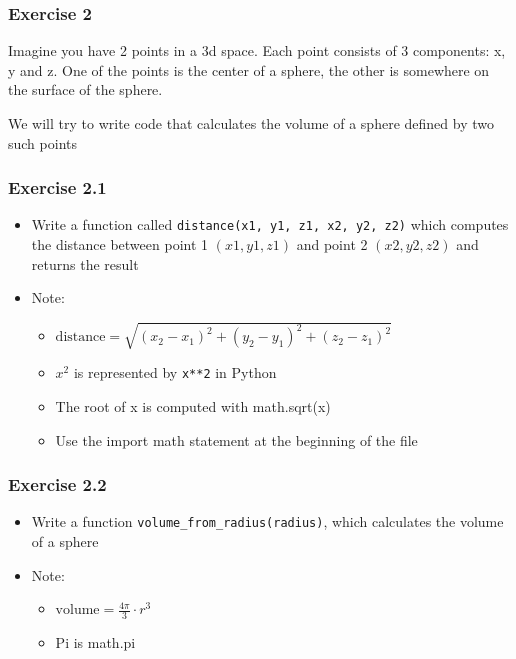 \documentclass[10pt, a4paper]{beamer} %
\begin{document}
{\begin{frame}
\end{frame}

\begin{frame}[c, fragile]\frametitle{Exercise 2}

    Imagine you have 2 points in a 3d space.
    Each point consists of 3 components: x, y and z.
    One of the points is the center of a sphere, the other is somewhere on the surface of the sphere.

    We will try to write code that calculates the volume of a sphere defined by two
    such points
\end{frame}
\begin{frame}[c, fragile]\frametitle{Exercise 2.1}
    \begin{itemize}
        \item Write a function called \texttt{distance(x1, y1, z1, x2, y2, z2)} which computes the distance between point 1 $(x1, y1, z1)$ and point 2 $(x2, y2, z2)$ and returns the result
        \item Note:
              \begin{itemize}
                  \item \( \text{distance} = \sqrt{\left(x_2 - x_1\right)^2 + \left(y_2 - y_1\right)^2 + \left(z_2 - z_1\right)^2} \)
                  \item $x^2$ is represented by \texttt{x**2} in Python
                  \item The root of x is computed with math.sqrt(x)
                  \item Use the import math statement at the beginning of the file
              \end{itemize}
    \end{itemize}
\end{frame}

\begin{frame}[c, fragile]\frametitle{Exercise 2.2}
    \begin{itemize}
        \item Write a function \texttt{volume\_from\_radius(radius)}, which calculates the
              volume of a sphere
        \item Note:
              \begin{itemize}
                  \item \( \text{volume} = \frac{4\pi}{3}\cdot r^3\)
                  \item Pi is math.pi
              \end{itemize}
    \end{itemize}


\end{frame}}
\end{document}
